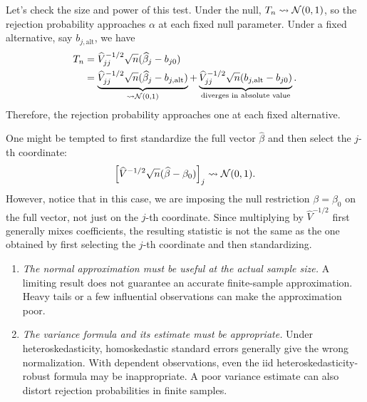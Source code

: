 \documentclass[a4paper,12pt]{article}
\begin{document}
\begin{remark}
	Let's check the size and power of this test.
	Under the null, $T_n\overset{}{\leadsto}\operatorname{\mathcal{N}}(0,1)$,
	so the rejection probability approaches $\alpha$ at each fixed null parameter.
	Under a fixed alternative, say $b_{j,\text{alt}}$, we have
	\begin{align}
		T_n
		&= \widehat V_{jj}^{-1/2}\sqrt{n}(\widehat\beta_j-b_{j0}) \\
		&= \underbrace{\widehat V_{jj}^{-1/2}\sqrt{n}(\widehat\beta_j-b_{j,\text{alt}})}_{\overset{}{\leadsto}\operatorname{\mathcal{N}}(0,1)}
		+ \underbrace{\widehat V_{jj}^{-1/2}\sqrt{n}(b_{j,\text{alt}}-b_{j0})}_{\text{diverges in absolute value}}.
	\end{align}
	Therefore, the rejection probability approaches one at each fixed alternative.
\end{remark}

\begin{remark}
	One might be tempted to first standardize the full vector $\widehat\beta$ and then select the $j$-th coordinate:
	\begin{align}
		\left[\widehat V^{-1/2}\sqrt n(\widehat\beta-\beta_0)\right]_j \overset{}{\leadsto}\operatorname{\mathcal{N}}(0,1).
	\end{align}
	However, notice that in this case, we are imposing the null restriction $\beta=\beta_0$ on the full vector, not just on the $j$-th coordinate.
	Since multiplying by $\widehat V^{-1/2}$ first generally mixes coefficients,
	the resulting statistic is not the same as the one obtained by first selecting the $j$-th coordinate and then standardizing.
\end{remark}

\begin{remark}\leavevmode
	\begin{enumerate}
		\item
			\emph{The normal approximation must be useful at the actual sample size.}
			A limiting result does not guarantee an accurate finite-sample approximation.
			Heavy tails or a few influential observations can make the approximation poor.
		\item
			\emph{The variance formula and its estimate must be appropriate.}
			Under heteroskedasticity, homoskedastic standard errors generally give the wrong normalization.
			With dependent observations, even the \gls{iid} heteroskedasticity-robust formula may be inappropriate.
			A poor variance estimate can also distort rejection probabilities in finite samples.
	\end{enumerate}
\end{remark}
\end{document}
